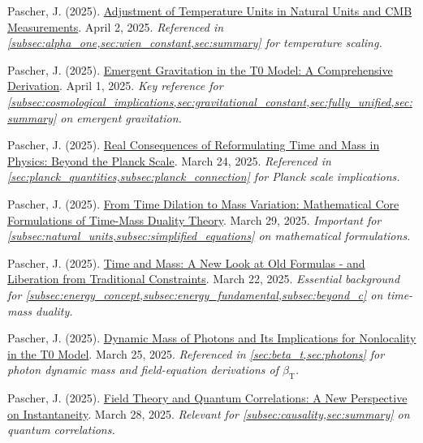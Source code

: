 \documentclass[12pt,a4paper]{article}
\newcommand{\betaT}{\beta_{\text{T}}}
\begin{document}
\begin{thebibliography}{99}
		 Pascher, J. (2025). \href{https://github.com/jpascher/T0-Time-Mass-Duality/tree/main/2/pdf/English/TempEinheitenCMBEn.pdf}{Adjustment of Temperature Units in Natural Units and CMB Measurements}. April 2, 2025. \textit{Referenced in \cref{subsec:alpha_one,sec:wien_constant,sec:summary} for temperature scaling.}
		
		 Pascher, J. (2025). \href{https://github.com/jpascher/T0-Time-Mass-Duality/tree/main/2/pdf/English/EmergentGravT0En.pdf}{Emergent Gravitation in the T0 Model: A Comprehensive Derivation}. April 1, 2025. \textit{Key reference for \cref{subsec:cosmological_implications,sec:gravitational_constant,sec:fully_unified,sec:summary} on emergent gravitation.}
		
		 Pascher, J. (2025). \href{https://github.com/jpascher/T0-Time-Mass-Duality/tree/main/2/pdf/English/JenseitsPlanckEn.pdf}{Real Consequences of Reformulating Time and Mass in Physics: Beyond the Planck Scale}. March 24, 2025. \textit{Referenced in \cref{sec:planck_quantities,subsec:planck_connection} for Planck scale implications.}
		
		 Pascher, J. (2025). \href{https://github.com/jpascher/T0-Time-Mass-Duality/tree/main/2/pdf/English/MathZeitMasseLagrangeEn.pdf}{From Time Dilation to Mass Variation: Mathematical Core Formulations of Time-Mass Duality Theory}. March 29, 2025. \textit{Important for \cref{subsec:natural_units,subsec:simplified_equations} on mathematical formulations.}
		
		 Pascher, J. (2025). \href{https://github.com/jpascher/T0-Time-Mass-Duality/tree/main/2/pdf/English/ZeitMasseNeuerBlickEn.pdf}{Time and Mass: A New Look at Old Formulas - and Liberation from Traditional Constraints}. March 22, 2025. \textit{Essential background for \cref{subsec:energy_concept,subsec:energy_fundamental,subsec:beyond_c} on time-mass duality.}
		
		 Pascher, J. (2025). \href{https://github.com/jpascher/T0-Time-Mass-Duality/tree/main/2/pdf/English/DynMassePhotonenNichtlokalEn.pdf}{Dynamic Mass of Photons and Its Implications for Nonlocality in the T0 Model}. March 25, 2025. \textit{Referenced in \cref{sec:beta_t,sec:photons} for photon dynamic mass and field-equation derivations of $\betaT$.}
		
		 Pascher, J. (2025). \href{https://github.com/jpascher/T0-Time-Mass-Duality/tree/main/2/pdf/English/FeldtheorieQuantenEn.pdf}{Field Theory and Quantum Correlations: A New Perspective on Instantaneity}. March 28, 2025. \textit{Relevant for \cref{subsec:causality,sec:summary} on quantum correlations.}
		

\end{thebibliography}
\end{document}
